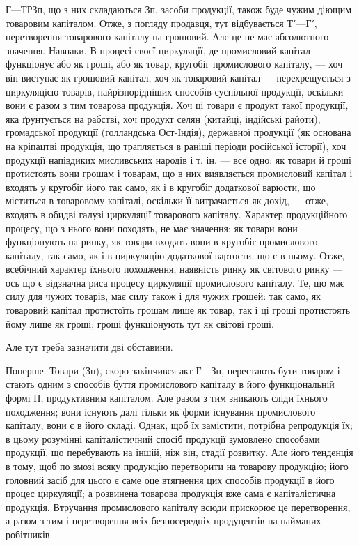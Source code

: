 \parcont{}  %
$Г — Т Р Зп$, що з них складаються Зп, засоби продукції, також буде
чужим діющим товаровим капіталом. Отже, з погляду продавця, тут
відбувається $Т' — Г'$, перетворення товарового капіталу на грошовий. Але
це не має абсолютного значення. Навпаки. В процесі своєї циркуляції,
де промисловий капітал функціонує або як гроші, або як товар, кругобіг
промислового капіталу, — хоч він виступає як грошовий капітал, хоч як
товаровий капітал — перехрещується з циркуляцією товарів, найрізнорідніших
способів суспільної продукції, оскільки вони є разом з тим товарова
продукція. Хоч ці товари є продукт такої продукції, яка ґрунтується
на рабстві, хоч продукт селян (китайці, індійські райоти),
громадської продукції (голландська Ост-Індія), державної продукції (як
основана на кріпацтві продукція, що трапляється в раніші періоди російської
історії), хоч продукції напівдиких мисливських народів і т. ін.
— все одно: як товари й гроші протистоять вони грошам і товарам,
що в них виявляється промисловий капітал і входять у кругобіг його так само,
як і в кругобіг додаткової варюсти, що міститься в товаровому капіталі,
оскільки її витрачається як дохід, — отже, входять в обидві галузі
циркуляції товарового капіталу. Характер продукційного процесу, що
з нього вони походять, не має значення; як товари вони функціонують
на ринку, як товари входять вони в кругобіг промислового капіталу, так
само, як і в циркуляцію додаткової вартости, що є в ньому. Отже, всебічний
характер їхнього походження, наявність ринку як світового ринку
— ось що є відзначна риса процесу циркуляції промислового капіталу.
Те, що має силу для чужих товарів, має силу також і для чужих грошей: так
само, як товаровий капітал протистоїть грошам лише як товар, так і ці
гроші протистоять йому лише як гроші; гроші функціонують тут як
світові гроші.

Але тут треба зазначити дві обставини.

Поперше. Товари (Зп), скоро закінчився акт $Г — Зп$, перестають бути
товаром і стають одним з способів буття промислового капіталу в його
функціональній формі П, продуктивним капіталом. Але разом з тим
зникають сліди їхнього походження; вони існують далі тільки як форми
існування промислового капіталу, вони є в його складі. Однак, щоб
їх замістити, потрібна репродукція їх; в цьому розумінні капіталістичний
спосіб продукції зумовлено способами продукції, що перебувають на
іншій, ніж він, стадії розвитку. Але його тенденція в тому, щоб по змозі
всяку продукцію перетворити на товарову продукцію; його головний засіб
для цього є саме оце втягнення цих способів продукції в його процес
циркуляції; а розвинена товарова продукція вже сама є капіталістична
продукція. Втручання промислового капіталу всюди прискорює це перетворення,
а разом з тим і перетворення всіх безпосередніх продуцентів
на найманих робітників.

